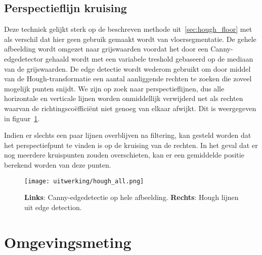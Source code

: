 \subsection{Perspectieflijn kruising}\label{sec:perspectieflijnkruising}
Deze techniek gelijkt sterk op de beschreven methode uit~\ref{sec:hough_floor} met als verschil dat hier geen gebruik gemaakt wordt van vloersegmentatie.
De gehele afbeelding wordt omgezet naar grijswaarden voordat het door een Canny-edgedetector gehaald wordt met een variabele treshold gebaseerd op de mediaan van de grijswaarden.
De edge detectie wordt wederom gebruikt om door middel van de Hough-transformatie een aantal aanliggende rechten te zoeken die zoveel mogelijk punten snijdt.
We zijn op zoek naar perspectieflijnen, dus alle horizontale en verticale lijnen worden onmiddellijk verwijderd net als rechten waarvan de richtingsco\"{e}ffici\"{e}nt
niet genoeg van elkaar afwijkt. Dit is weergegeven in figuur~\ref{fig:hough_all}.

Indien er slechts een paar lijnen overblijven na filtering, kan gesteld worden dat het perspectiefpunt te vinden is op de kruising van de rechten.
In het geval dat er nog meerdere kruispunten zouden overschieten, kan er een gemiddelde positie berekend worden van deze punten.

\begin{figure}
    \texttt{[image: uitwerking/hough\_all.png]}
    \caption{\textbf{Links}: Canny-edgedetectie op hele afbeelding. \textbf{Rechts}: Hough lijnen uit edge detection.}
    \label{fig:hough_all}
\end{figure}


\section{Omgevingsmeting} \label{sec:omgevingsmeting}

